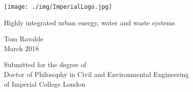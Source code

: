\begin{titlepage}

  \texttt{[image: ./img/ImperialLogo.jpg]}\\[1cm]

    \begin{center}
        \vspace*{1cm}
        
        {\LARGE Highly integrated urban energy, water and waste systems}
        
        \vspace{1.5cm}
        
        Tom Ravalde \\
        \vspace{0.8cm}
        March 2018
        
        \vfill
        
        Submitted for the degree of \\
	Doctor of Philosophy in Civil and Environmental Engineering\\
	of Imperial College London
        
    \end{center}

\end{titlepage}
